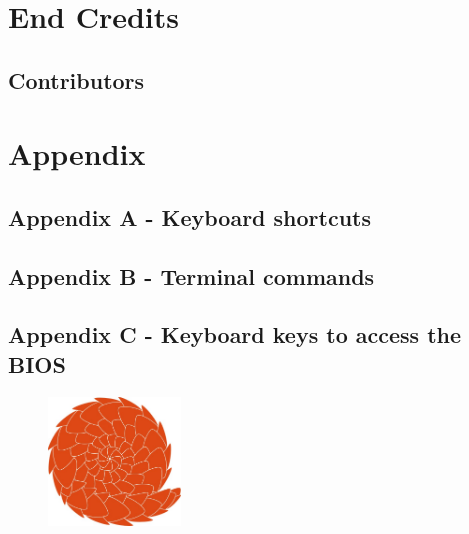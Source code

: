 \documentclass[10pt,a4paper,oneside,final,titlepage]{book}
\begin{document}
\part{End Credits}

\chapter{Contributors}



\thispagestyle{empty}
\mbox{}
\pagestyle{fancy}
	\fancyhf{}
	\lhead{}
	\rhead{}
	\cfoot{\thepage}
	\renewcommand{\headrulewidth}{0pt}
\part{Appendix}

\chapter{Appendix A - Keyboard shortcuts}


\chapter{Appendix B - Terminal commands}


\chapter{Appendix C - Keyboard keys to access the BIOS}


\printindex

\newpage

\begin{figure}[h!]	
	\vspace{10cm}
	\centering
	\includegraphics[width=100pt]{./images/logo.jpg}
	\label{fig:logo}	
\end{figure}
\end{document}
